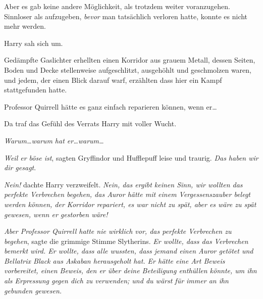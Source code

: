 Aber es gab keine andere Möglichkeit, als trotzdem weiter voranzugehen. Sinnloser als aufzugeben, \emph{bevor} man tatsächlich verloren hatte, konnte es nicht mehr werden.

Harry sah sich um.

Gedämpfte Gaslichter erhellten einen Korridor aus grauem Metall, dessen Seiten, Boden und Decke stellenweise aufgeschlitzt, ausgehöhlt und geschmolzen waren, und jedem, der einen Blick darauf warf, erzählten dass hier ein Kampf stattgefunden hatte.

Professor Quirrell hätte es ganz einfach reparieren können, wenn er…

Da traf das Gefühl des Verrats Harry mit voller Wucht.

\emph{Warum…warum hat er…warum…}

\emph{Weil er böse ist}, sagten Gryffindor und Hufflepuff leise und traurig. \emph{Das haben wir dir gesagt}.

\emph{Nein!} dachte Harry verzweifelt. \emph{Nein, das ergibt keinen Sinn, wir wollten das perfekte Verbrechen begehen, das Auror hätte mit einem Vergessenszauber belegt werden können, der Korridor repariert, es war nicht zu spät, aber es wäre zu spät gewesen, wenn er gestorben wäre!}

\emph{Aber Professor Quirrell hatte nie wirklich vor, das perfekte Verbrechen zu begehen}, sagte die grimmige Stimme Slytherins. \emph{Er wollte, dass das Verbrechen bemerkt wird. Er wollte, dass alle wussten, dass jemand einen Auror getötet und Bellatrix Black aus Askaban herausgeholt hat. Er hätte eine Art Beweis vorbereitet, einen Beweis, den er über deine Beteiligung enthüllen könnte, um ihn als Erpressung gegen dich zu verwenden; und du wärst für immer an ihn gebunden gewesen.}

